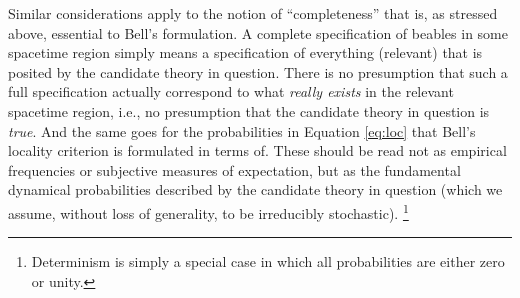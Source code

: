 \documentclass[12pt]{article}
\begin{document}
Similar considerations apply to the notion of ``completeness'' that
is, as stressed above, essential to Bell's
formulation.   A  complete specification of
beables in some spacetime region simply means a specification of
everything (relevant) that is posited by the candidate theory in
question.  There is no presumption that such a full specification
actually correspond to what \emph{really exists} in the relevant
spacetime region, i.e., no presumption that the candidate theory in
question is \emph{true}.
And the same goes for the probabilities in Equation
\ref{eq:loc} that Bell's locality criterion is formulated in terms
of.  These should be read not as empirical frequencies or subjective
measures of expectation, but as the fundamental dynamical
probabilities described by the candidate theory in question (which we
assume, without loss of generality, to be irreducibly stochastic).%
\footnote{Determinism is simply a special case in which all
  probabilities are either zero or unity.}
\end{document}
